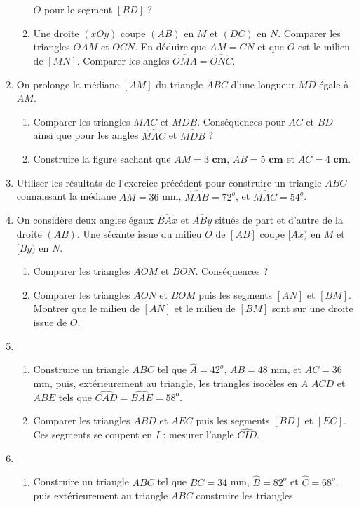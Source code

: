 \documentclass[12 pt]{report}
\theoremstyle{plain}
\newcounter{n}
\newcommand{\cm}{\textbf{ cm}}
\begin{document}
\begin{enumerate}
\begin{enumerate}
$O$ pour le segment $[BD]$ ? 
\item Une droite $(xOy)$ coupe $(AB)$ en $M$ et $(DC)$ en $N$. Comparer les triangles
$OAM$ et $OCN$. En déduire que $AM=CN$ et que $O$ est le milieu de $[MN]$. Comparer
les angles $\widehat{OMA}=\widehat{ONC}$. 
\end{enumerate}
\item On prolonge la médiane $[AM]$ du triangle $ABC$ d'une longueur $MD$ égale à $AM$. \begin{enumerate}
\item Comparer les triangles $MAC$ et $MDB$. Conséquences pour $AC$ et $BD$ ainsi que pour les angles $\widehat{MAC}$ et $\widehat{MDB}$ ?
\item Construire la figure sachant que $AM = 3\cm$, $AB=5\cm$ et $AC=4\cm$. 
\end{enumerate}
\item Utiliser les résultats de l'exercice précédent pour construire un triangle 
$ABC$ connaissant la médiane $AM = 36$ mm, $\widehat{MAB}= 72^o$, et $\widehat{MAC}= 54^o$. 
\item On considère deux angles égaux $\widehat{BAx}$ et $\widehat{ABy}$ situés
de part et d'autre de la droite $(AB)$. Une sécante issue du milieu $O$ de $[AB]$ coupe $[Ax)$ en $M$ et $[By)$ en $N$. \begin{enumerate}
\item Comparer les triangles $AOM$ et $BON$. Conséquences ? 
\item Comparer les triangles $AON$ et $BOM$ puis les segments $[AN]$ et $[BM]$.
Montrer que le milieu de $[AN]$ et le milieu de $[BM]$ sont sur une droite issue de 
$O$. 
\end{enumerate}
\item \begin{enumerate}
\item Construire un triangle $ABC$ tel que $\widehat{A}=42^o$, $AB=48$ mm, et $AC=36$ mm, puis, extérieurement au triangle, les triangles isocèles en $A$ $ACD$ et $ABE$ tels que $\widehat{CAD}= \widehat{BAE}= 58^o$.
\item Comparer les triangles $ABD$ et $AEC$ puis les segments $[BD]$ et $[EC]$. Ces
segments se coupent en $I$ : mesurer l'angle $\widehat{CID}$. 
\end{enumerate}
\item \begin{enumerate}
\item Construire un triangle $ABC$ tel que $BC=34$ mm, $\widehat{B}=82^o$ et $\widehat{C}= 68^o$, puis extérieurement au triangle $ABC$ construire les triangles 

\end{enumerate}
\end{enumerate}
\end{document}

